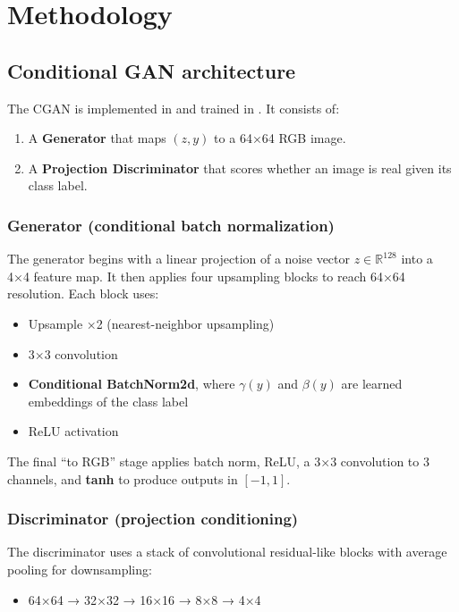 \section{Methodology}

\subsection{Conditional GAN architecture}

The CGAN is implemented in  and trained in . It consists of:
\begin{enumerate}
\item A \textbf{Generator} that maps \((z, y)\) to a 64×64 RGB image.
\item A \textbf{Projection Discriminator} that scores whether an image is real given its class label.
\end{enumerate}

\subsubsection{Generator (conditional batch normalization)}

The generator begins with a linear projection of a noise vector \(z \in \mathbb{R}^{128}\) into a 4×4 feature map. It then applies four upsampling blocks to reach 64×64 resolution. Each block uses:
\begin{itemize}
\item Upsample ×2 (nearest-neighbor upsampling)
\item 3×3 convolution
\item \textbf{Conditional BatchNorm2d}, where \(\gamma(y)\) and \(\beta(y)\) are learned embeddings of the class label
\item ReLU activation
\end{itemize}

The final ``to RGB'' stage applies batch norm, ReLU, a 3×3 convolution to 3 channels, and \textbf{tanh} to produce outputs in \([-1, 1]\).

\subsubsection{Discriminator (projection conditioning)}

The discriminator uses a stack of convolutional residual-like blocks with average pooling for downsampling:
\begin{itemize}
\item 64×64 → 32×32 → 16×16 → 8×8 → 4×4
\end{itemize}

